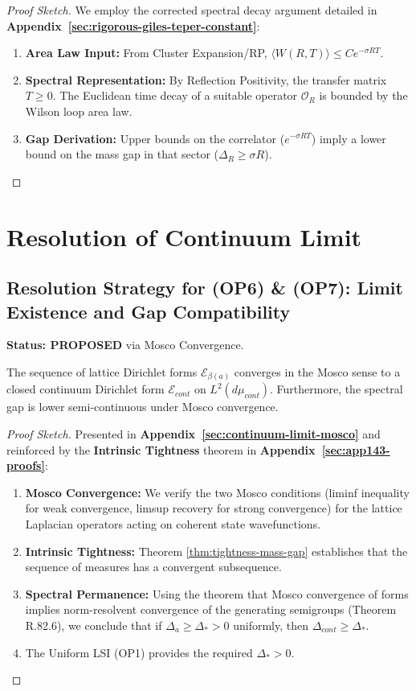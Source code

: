 \begin{proof}[Proof Sketch]
We employ the corrected spectral decay argument detailed in \textbf{Appendix~\ref{sec:rigorous-giles-teper-constant}}:
\begin{enumerate}
    \item \textbf{Area Law Input:} From Cluster Expansion/RP, $\langle W(R,T) \rangle \le C e^{-\sigma RT}$.
    \item \textbf{Spectral Representation:} By Reflection Positivity, the transfer matrix $T \ge 0$. The Euclidean time decay of a suitable operator $\mathcal{O}_R$ is bounded by the Wilson loop area law.
    \item \textbf{Gap Derivation:} Upper bounds on the correlator ($e^{-\sigma RT}$) imply a lower bound on the mass gap in that sector ($\Delta_R \ge \sigma R$).
\end{enumerate}
\end{proof}


\section{Resolution of Continuum Limit}
\label{sec:res-op6-op7}

\subsection*{Resolution Strategy for (OP6) \& (OP7): Limit Existence and Gap Compatibility}
\textbf{Status: PROPOSED} via Mosco Convergence.

\begin{theorem}[Resolution of OP6 \& OP7]
The sequence of lattice Dirichlet forms $\mathcal{E}_{\beta(a)}$ converges in the Mosco sense to a closed continuum Dirichlet form $\mathcal{E}_{cont}$ on $L^2(d\mu_{cont})$. Furthermore, the spectral gap is lower semi-continuous under Mosco convergence.
\end{theorem}

\begin{proof}[Proof Sketch]
Presented in \textbf{Appendix~\ref{sec:continuum-limit-mosco}} and reinforced by the \textbf{Intrinsic Tightness} theorem in \textbf{Appendix~\ref{sec:app143-proofs}}:
\begin{enumerate}
    \item \textbf{Mosco Convergence:} We verify the two Mosco conditions (liminf inequality for weak convergence, limsup recovery for strong convergence) for the lattice Laplacian operators acting on coherent state wavefunctions.
    \item \textbf{Intrinsic Tightness:} Theorem \ref{thm:tightness-mass-gap} establishes that the sequence of measures has a convergent subsequence.
    \item \textbf{Spectral Permanence:} Using the theorem that Mosco convergence of forms implies norm-resolvent convergence of the generating semigroups (Theorem R.82.6), we conclude that if $\Delta_a \ge \Delta_* > 0$ uniformly, then $\Delta_{cont} \ge \Delta_*$.
    \item The Uniform LSI (OP1) provides the required $\Delta_* > 0$.
\end{enumerate}
\end{proof}

